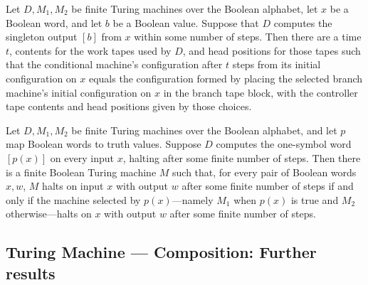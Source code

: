 \begin{lemma}
\label{Turing.FinTM.condTM_start}
\leanok
{}
Let $D,M_1,M_2$ be finite Turing machines over the Boolean alphabet, let $x$ be a
Boolean word, and let $b$ be a Boolean value. Suppose that $D$ computes the singleton
output $[b]$ from $x$ within some number of steps. Then there are a time $t$, contents
for the work tapes used by $D$, and head positions for those tapes such that the
conditional machine's configuration after $t$ steps from its initial configuration on
$x$ equals the configuration formed by placing the selected branch machine's initial
configuration on $x$ in the branch tape block, with the controller tape contents and
head positions given by those choices.
\end{lemma}

\begin{theorem}
\label{Turing.FinTM.exists_cond}
\leanok
{}
Let $D,M_1,M_2$ be finite Turing machines over the Boolean alphabet, and let $p$ map
Boolean words to truth values. Suppose $D$ computes the one-symbol word $[p(x)]$ on
every input $x$, halting after some finite number of steps. Then there is a finite
Boolean Turing machine $M$ such that, for every pair of Boolean words $x,w$, $M$ halts
on input $x$ with output $w$ after some finite number of steps if and only if the
machine selected by $p(x)$—namely $M_1$ when $p(x)$ is true and $M_2$ otherwise—halts on
$x$ with output $w$ after some finite number of steps.
\end{theorem}

\subsection*{Turing Machine --- Composition: Further results}

